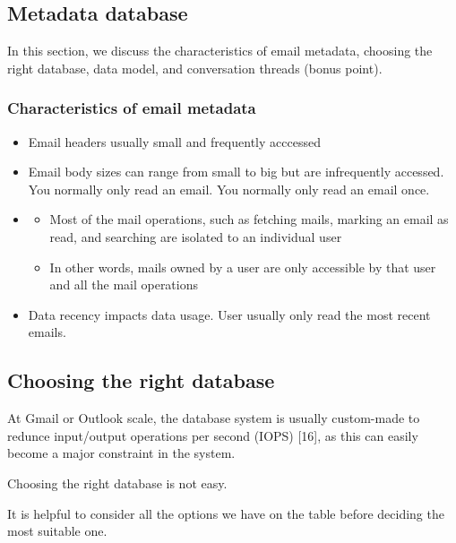 \documentclass{report}
\theoremstyle{definition}
\let\oldsubsection\subsection
\let\oldsubsubsection\subsubsection
\renewcommand{\subsection}{\oldsubsection*}
\renewcommand{\subsubsection}{\oldsubsubsection*}
\begin{document}
\subsection{Metadata database}

In this section, we discuss the characteristics of email metadata, choosing the right database, data model, and conversation threads (bonus point).

\subsubsection{Characteristics of email metadata}

\begin{itemize}
\item
Email headers usually small and frequently acccessed
\item
Email body sizes can range from small to big but are infrequently accessed. You normally only read an email. You normally only read an email once.
\item

\begin{itemize}
\item
Most of the mail operations, such as fetching mails, marking an email as read, and searching are isolated to an individual user
\item
In other words, mails owned by a user are only accessible by that user and all the mail operations
\end{itemize}

\item
Data recency impacts data usage. User usually only read the most recent emails.
\end{itemize}

\subsection{Choosing the right database}

At Gmail or Outlook scale, the database system is usually custom-made to redunce input/output operations per second (IOPS) [16], as this can easily become a major constraint in the system.

Choosing the right database is not easy.

It is helpful to consider all the options we have on the table before deciding the most suitable one.
\end{document}

